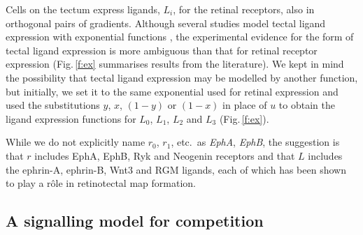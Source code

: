 \documentclass[11pt, a4paper]{article}
\begin{document}
Cells on the tectum express ligands, $L_i$, for the retinal receptors, also in orthogonal pairs of gradients.
Although several studies model tectal ligand expression with exponential functions \citep{koulakov_stochastic_2004}, the experimental evidence for the form of tectal ligand expression is more ambiguous than that for retinal receptor expression (Fig.\,\ref{f:ex} summarises results from the literature). 
We kept in mind the possibility that tectal ligand expression may be modelled by another function, but initially, we set it to the same exponential used for retinal expression and used the substitutions $y$, $x$, $(1-y)$ or $(1-x)$ in place of $u$ to obtain the ligand expression functions for $L_0$, $L_1$, $L_2$ and $L_3$ (Fig.\,\ref{f:ex}).

While we do not explicitly name $r_0$, $r_1$, etc.~as \emph{EphA}, \emph{EphB}, the suggestion is that $r$ includes EphA, EphB, Ryk \citep{schmitt_wntryk_2006} and Neogenin \citep{rajagopalan_neogenin_2004} receptors and that $L$ includes the ephrin-A, ephrin-B, Wnt3 \citep{schmitt_wntryk_2006} and RGM \citep{monnier_rgm_2002} ligands, each of which has been shown to play a r\^ole in retinotectal map formation.

\subsection*{A signalling model for competition}
 
\end{document}
